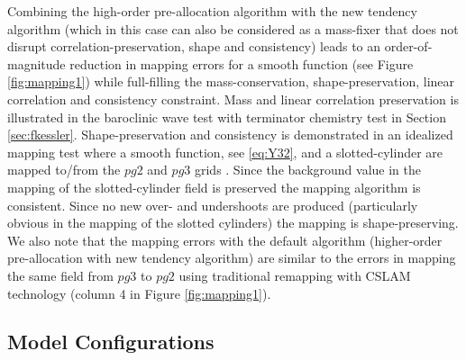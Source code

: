 \documentclass{agujournal}
\begin{document}
Combining the high-order pre-allocation algorithm with the new tendency algorithm (which in this case can also be considered as a mass-fixer that does not disrupt correlation-preservation, shape and consistency) leads to an order-of-magnitude reduction in mapping errors for a smooth function (see Figure \ref{fig:mapping1}) while full-filling the mass-conservation, shape-preservation, linear correlation and consistency  constraint. Mass and linear correlation preservation is illustrated in the baroclinic wave test with terminator chemistry test in Section \ref{sec:fkessler}. Shape-preservation and consistency is demonstrated in an idealized mapping test where a smooth function, see \eqref{eq:Y32}, and a slotted-cylinder \citep[see equation 12 in ][]{LSPT2012GMD} are mapped to/from the $pg2$ and $pg3$ grids {}. Since the background value in the mapping of the slotted-cylinder field is preserved the mapping algorithm is consistent. Since no new over- and undershoots are produced (particularly obvious in the mapping of the slotted cylinders) the mapping is shape-preserving. We also note that the mapping errors with the default algorithm (higher-order pre-allocation with new tendency algorithm) are similar to the errors in mapping the same field from $pg3$ to $pg2$ using traditional remapping with CSLAM technology (column 4 in Figure \ref{fig:mapping1}).


\subsection{Model Configurations}\label{sec:config}
\end{document}
